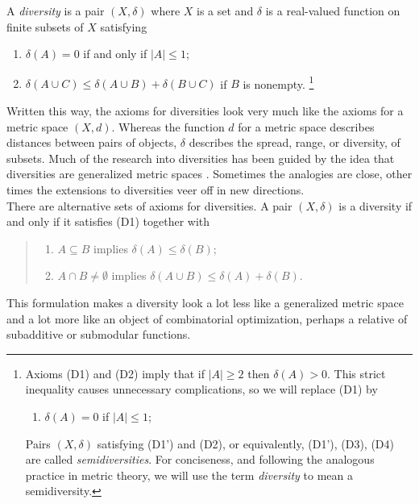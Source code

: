 \documentclass{article}
\theoremstyle{plain}
\theoremstyle{definition}
\begin{document}
 A {\em diversity} is a pair $(X,\delta)$ where $X$ is a set and $\delta$ is a real-valued function on finite subsets of $X$ satisfying
 \begin{enumerate}
    \item[(D1)] $\delta(A)=0$ if and only if $|A|\leq 1$;
    \item[(D2)] $\delta(A \cup C) \leq \delta( A \cup B) + \delta(B \cup C)$ if $B$ is nonempty. \footnote{Axioms (D1) and (D2) imply that if $|A| \geq 2$ then $\delta(A) > 0$. This strict inequality causes unnecessary complications, so we will replace (D1) by
\begin{enumerate}
    \item[(D1')] $\delta(A)=0$ if $|A|\leq 1$;
\end{enumerate}
Pairs $(X,\delta)$ satisfying (D1') and (D2), or equivalently, (D1'), (D3), (D4) are called {\em semidiversities}. For conciseness, and following the analogous practice in metric theory, we will use the term {\em diversity} to mean a semidiversity.}
    \end{enumerate}
Written this way, the axioms for diversities look very much like the axioms for a metric space $(X,d)$. Whereas the function $d$ for a metric space describes distances between pairs of objects, $\delta$ describes the spread, range, or diversity, of subsets. Much of the research into diversities has been guided by the idea that diversities are generalized metric spaces \cite{BryantNiesEtal17,BryantNiesEtal21,bryant2024linear,BryantTupper12,BryantTupper14,espinola2014diversities,HaghmaramNourouzi20,Hallback20,jozefiak2023diversity,KirkShahzad14,WuBryantEtal19}. Sometimes the analogies are close, other times the extensions to diversities veer off in new directions. \\

There are alternative sets of axioms for diversities. A pair $(X,\delta)$ is a diversity if and only if it satisfies (D1) together with
 \begin{quote}
\begin{enumerate}
\item[(D3)] $A \subseteq B$ implies $\delta(A) \leq \delta(B)$;
\item[(D4)] $A \cap B \neq \emptyset$ implies $\delta(A \cup B) \leq \delta(A) + \delta(B)$.
\end{enumerate}
\end{quote}
This formulation makes a diversity look a lot less like a generalized metric space and a lot more like an object of combinatorial optimization, perhaps a relative of subadditive or submodular functions.  
\end{document}

